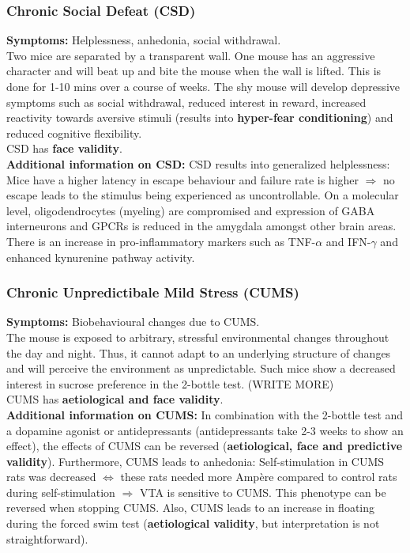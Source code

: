 \documentclass[twosided, a4paper, pt11]{article}
\begin{document}
	\subsubsection{Chronic Social Defeat (CSD)}
	\textbf{Symptoms: }Helplessness, anhedonia, social withdrawal.\\
	Two mice are separated by a transparent wall. One mouse has an aggressive character and will beat up and bite the mouse when the wall is lifted. This is done for 1-10 mins over a course of weeks. The shy mouse will develop depressive symptoms such as social withdrawal, reduced interest in reward, increased reactivity towards aversive stimuli (results into \textbf{hyper-fear conditioning}) and reduced cognitive flexibility.\\
	CSD has \textbf{face validity}.\\
	\textbf{Additional information on CSD:} CSD results into generalized helplessness: Mice have a higher latency in escape behaviour and failure rate is higher $\Rightarrow$ no escape leads to the stimulus being experienced as uncontrollable. On a molecular level, oligodendrocytes (myeling) are compromised and expression of GABA interneurons and GPCRs is reduced in the amygdala amongst other brain areas.\\
	There is an increase in pro-inflammatory markers such as TNF-$\alpha$ and IFN-$\gamma$ and enhanced kynurenine pathway activity.
	
	\subsubsection{Chronic Unpredictibale Mild Stress (CUMS)}
	\textbf{Symptoms: } Biobehavioural changes due to CUMS.\\
	The mouse is exposed to arbitrary, stressful environmental changes throughout the day and night. Thus, it cannot adapt to an underlying structure of changes and will perceive the environment as unpredictable. Such mice show a decreased interest in sucrose preference in the 2-bottle test. (WRITE MORE)\\
	CUMS has \textbf{aetiological and face validity}.\\
	\textbf{Additional information on CUMS:} In combination with the 2-bottle test and a dopamine agonist or antidepressants (antidepressants take 2-3 weeks to show an effect), the effects of CUMS can be reversed (\textbf{aetiological, face and predictive validity}). Furthermore, CUMS leads to anhedonia: Self-stimulation in CUMS rats was decreased $\Leftrightarrow$ these rats needed more Amp\`ere compared to control rats during self-stimulation $\Rightarrow$ VTA is sensitive to CUMS. This phenotype can be reversed when stopping CUMS. Also, CUMS leads to an increase in floating during the forced swim test (\textbf{aetiological validity}, but interpretation is not straightforward).
	
\end{document}
